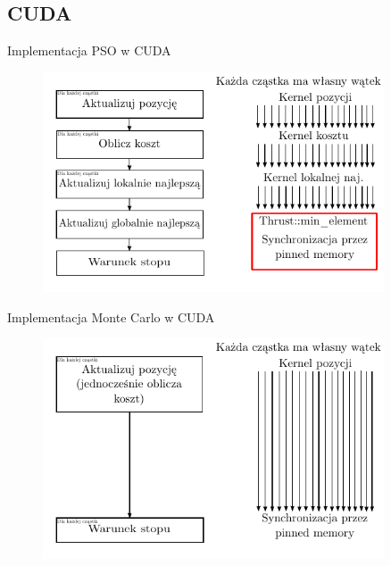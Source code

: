 \documentclass[handout]{beamer}
\begin{document}
\subsection{CUDA}
\begin{frame}{Implementacja PSO w CUDA}
\begin{figure}[t]
\includegraphics[width=0.9\textwidth]{grafiki/alg_CUDA_PSO.pdf}
\end{figure}
\end{frame}

\begin{frame}{Implementacja Monte Carlo w CUDA}
\begin{figure}[t]
\includegraphics[width=0.9\textwidth]{grafiki/alg_CUDA_MC.pdf}
\end{figure}
\end{frame}
\end{document}
